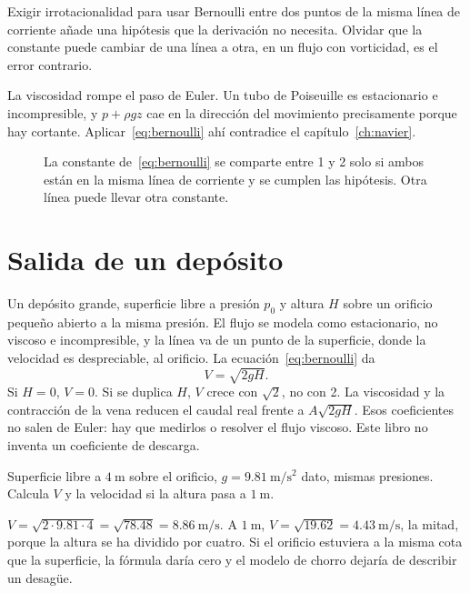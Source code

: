 \begin{errorbox}
Exigir irrotacionalidad para usar Bernoulli entre dos puntos de la misma línea de corriente añade una hipótesis que la derivación no necesita. Olvidar que la constante puede cambiar de una línea a otra, en un flujo con vorticidad, es el error contrario.
\end{errorbox}

La viscosidad rompe el paso de Euler. Un tubo de Poiseuille es estacionario e incompresible, y \(p+\rho gz\) cae en la dirección del movimiento precisamente porque hay cortante. Aplicar~\eqref{eq:bernoulli} ahí contradice el capítulo~\ref{ch:navier}.

\begin{figure}[ht]
\centering
{}
\caption{La constante de~\eqref{eq:bernoulli} se comparte entre 1 y 2 solo si ambos están en la misma línea de corriente y se cumplen las hipótesis. Otra línea puede llevar otra constante.}
\label{fig:bernoulli-linea}
\end{figure}

\section{Salida de un depósito}

Un depósito grande, superficie libre a presión \(p_0\) y altura \(H\) sobre un orificio pequeño abierto a la misma presión. El flujo se modela como estacionario, no viscoso e incompresible, y la línea va de un punto de la superficie, donde la velocidad es despreciable, al orificio. La ecuación~\eqref{eq:bernoulli} da
\begin{equation}
\label{eq:torricelli}
V=\sqrt{2gH}.
\end{equation}
Si \(H=0\), \(V=0\). Si se duplica \(H\), \(V\) crece con \(\sqrt{2}\), no con 2. La viscosidad y la contracción de la vena reducen el caudal real frente a \(A\sqrt{2gH}\). Esos coeficientes no salen de Euler: hay que medirlos o resolver el flujo viscoso. Este libro no inventa un coeficiente de descarga.

\begin{problembox}[Básico]
Superficie libre a \(\qty{4}{\metre}\) sobre el orificio, \(g=\qty{9.81}{\metre\per\second\squared}\) dato, mismas presiones. Calcula \(V\) y la velocidad si la altura pasa a \(\qty{1}{\metre}\).
\end{problembox}
\begin{solutionbox}
\(V=\sqrt{2\cdot 9.81\cdot 4}=\sqrt{78.48}=\qty{8.86}{\metre\per\second}\).
A \(\qty{1}{\metre}\), \(V=\sqrt{19.62}=\qty{4.43}{\metre\per\second}\), la mitad, porque la altura se ha dividido por cuatro. Si el orificio estuviera a la misma cota que la superficie, la fórmula daría cero y el modelo de chorro dejaría de describir un desagüe.
\end{solutionbox}


